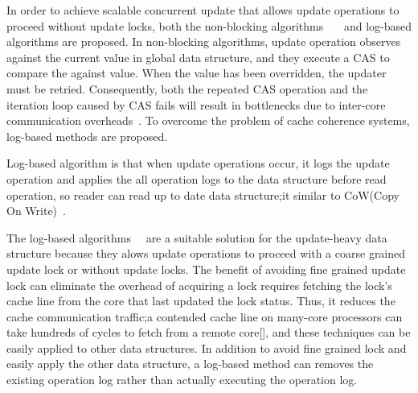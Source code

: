 
In order to achieve scalable concurrent update that allows update operations
to proceed without update locks, both the non-blocking
algorithms~\cite{Harris2001Lockfree}~\cite{Fomitchev2004Lockfree}~\cite{Timnat2012}
and log-based algorithms are proposed.
In non-blocking algorithms, update operation observes against the current
value in global data structure, and they execute a CAS to compare the against
value.
When the value has been overridden, the updater must be retried.
Consequently, both the repeated CAS operation and the iteration loop caused
by CAS fails will result in bottlenecks due to inter-core communication
overheads~\cite{SilasBoydWickizerPth}.
To overcome the problem of cache coherence systems, log-based methods are
proposed.


Log-based algorithm is that when update operations occur, it logs the update
operation and applies the all operation logs to the data structure
before read operation, so reader can read up to date data structure;it similar
to CoW(Copy On Write)~\cite{PaulDetailLWN}.

The log-based algorithms~\cite{Hendler2010FC}~\cite{SilasBoydWickizerPth} are
a suitable solution for the update-heavy data structure because they alows
update operations to proceed with a coarse grained update lock or without
update locks.
The benefit of avoiding fine grained update lock can eliminate the overhead of
acquiring a lock requires fetching the lock's cache line from the core that
last updated the lock status.
Thus, it reduces the cache communication traffic;a contended cache line on
many-core processors can take hundreds of cycles to fetch from a remote
core[], and these techniques can be easily applied to other data structures.
In addition to avoid fine grained lock and easily apply the
other data structure, a log-based method can removes the existing
operation log rather than actually executing the operation log.


